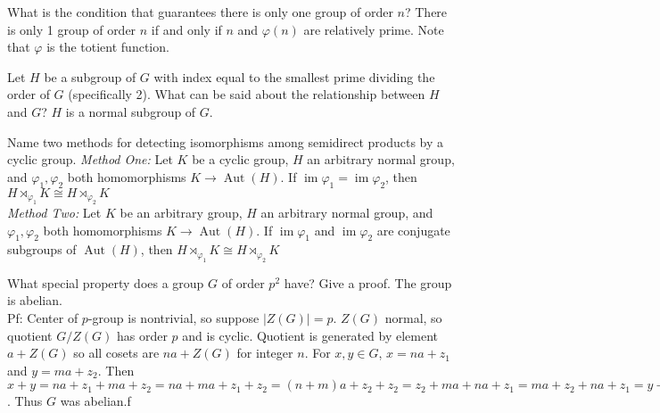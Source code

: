 \documentclass[avery5371,grid]{flashcards}
\DeclareMathOperator{\img}{im}
\DeclareMathOperator{\Aut}{Aut}
\let \phi \varphi
\begin{document}



\begin{flashcard}[Group]{What is the condition that guarantees there is only one group of order $n$?}
 There is only 1 group of order $n$ if and only if $n$ and $\phi(n)$ are relatively prime. Note that $\phi$ is the totient function.
\end{flashcard}

\begin{flashcard}[Groups]{Let $H$ be a subgroup of $G$ with index equal to the smallest prime dividing the order of $G$ (specifically 2). What can be said about the relationship between $H$ and $G$?}
$H$ is a normal subgroup of $G$.
\end{flashcard}

\begin{flashcard}[Groups]{Name two methods for detecting isomorphisms among semidirect products by a cyclic group.}
\emph{Method One: }Let $K$ be a cyclic group, $H$ an arbitrary normal group, and $\phi_1, \phi_2$ both homomorphisms $K \to \Aut(H)$. If $\img \phi_1 = \img \phi_2$, then $H \rtimes_{\phi_1} K \cong H \rtimes_{\phi_2} K$\\

\emph{Method Two: }Let $K$ be an arbitrary group, $H$ an arbitrary normal group, and $\phi_1, \phi_2$ both homomorphisms $K \to \Aut(H)$. If $\img \phi_1$ and $\img \phi_2$ are conjugate subgroups of $\Aut (H)$, then $H \rtimes_{\phi_1} K \cong H \rtimes_{\phi_2} K$\\
\end{flashcard}

\begin{flashcard}[Groups]{What special property does a group $G$ of order $p^2$ have? Give a proof.}
 The group is abelian. \\
 
 Pf: Center of $p$-group is nontrivial, so suppose $|Z(G)| = p$. $Z(G)$ normal, so quotient $G/Z(G)$ has order $p$ and is cyclic. Quotient is generated by element $a + Z(G)$ so all cosets are $na + Z(G)$ for integer $n$. For $x,y \in G$, $x = na + z_1$ and $y = ma + z_2$. Then $x + y = na + z_1 + ma + z_2 = na + ma + z_1 + z_2 = (n+m)a + z_2 + z_2 = z_2 + ma + na + z_1 = ma + z_2 + na + z_1 = y + x$. Thus $G$ was abelian.f
\end{flashcard}
\end{document}
